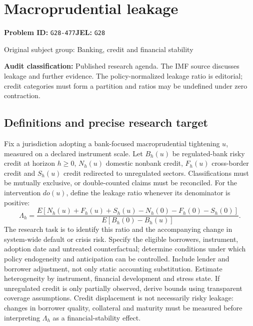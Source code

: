 \documentclass[11pt,a4paper]{article}
\begin{document}
\section*{Macroprudential leakage}
\textbf{Problem ID:} \texttt{G28-477}\quad \textbf{JEL:} \texttt{G28}\par
\label{problem:OP-0323}
{\sffamily\small\color{muted}Original subject group: Banking, credit and financial stability\par}
\label{definitions:problem:30007605}
\textbf{Audit classification:} Published research agenda. The IMF source discusses leakage and further evidence. The policy-normalized leakage ratio is editorial; credit categories must form a partition and ratios may be undefined under zero contraction.
\subsection*{Definitions and precise research target}
Fix a jurisdiction adopting a bank-focused macroprudential tightening \(u\), measured on a declared instrument scale. Let \(B_h(u)\) be regulated-bank risky credit at horizon \(h\geq0\), \(N_h(u)\) domestic nonbank credit, \(F_h(u)\) cross-border credit and \(S_h(u)\) credit redirected to unregulated sectors. Classifications must be mutually exclusive, or double-counted claims must be reconciled. For the intervention \(do(u)\), define the leakage ratio whenever its denominator is positive:
\[\Lambda_h=\frac{E[N_h(u)+F_h(u)+S_h(u)-N_h(0)-F_h(0)-S_h(0)]}{E[B_h(0)-B_h(u)]}.\]
The research task is to identify this ratio and the accompanying change in system-wide default or crisis risk. Specify the eligible borrowers, instrument, adoption date and untreated counterfactual; determine conditions under which policy endogeneity and anticipation can be controlled. Include lender and borrower adjustment, not only static accounting substitution. Estimate heterogeneity by instrument, financial development and stress state. If unregulated credit is only partially observed, derive bounds using transparent coverage assumptions. Credit displacement is not necessarily risky leakage: changes in borrower quality, collateral and maturity must be measured before interpreting \(\Lambda_h\) as a financial-stability effect.
\end{document}
